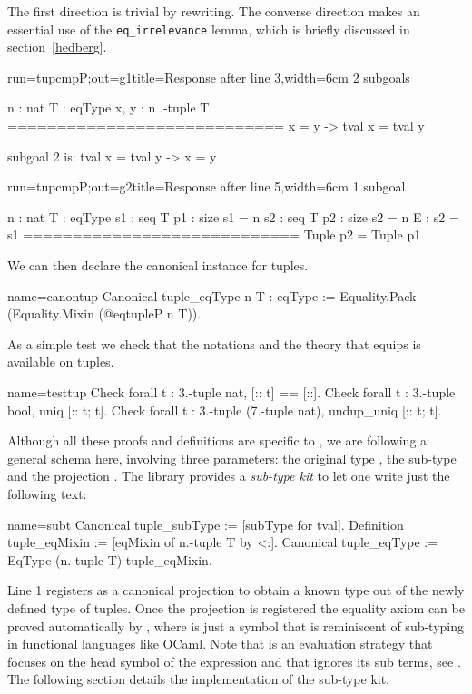 The first direction is trivial by rewriting.
The converse direction makes an essential use of
the \lstinline/eq_irrelevance/ lemma, which is briefly discussed
in section~\ref{hedberg}.

\begin{coqout}{run=tupcmpP;out=g1}{title=Response after line 3,width=6cm}
2 subgoals

n : nat
T : eqType
x, y : n .-tuple T
============================
x = y -> tval x = tval y

subgoal 2 is:
  tval x = tval y -> x = y
$~$
\end{coqout}
\begin{coqout}{run=tupcmpP;out=g2}{title=Response after line 5,width=6cm}
1 subgoal

n : nat
T : eqType
s1 : seq T
p1 : size s1 = n
s2 : seq T
p2 : size s2 = n
E : s2 = s1
============================
Tuple p2 = Tuple p1
\end{coqout}

We can then declare the canonical  instance for tuples.

\begin{coq}{name=canontup}{}
Canonical tuple_eqType n T : eqType :=
  Equality.Pack (Equality.Mixin (@eqtupleP n T)).
\end{coq}

As a simple test we check that the notations and the theory
that equips  is available on tuples.

\begin{coq}{name=testtup}{}
Check forall t : 3.-tuple nat, [:: t] == [::].
Check forall t : 3.-tuple bool, uniq [:: t; t].
Check forall t : 3.-tuple (7.-tuple nat), undup_uniq [:: t; t].
\end{coq}

Although all these proofs and definitions are specific to ,
we are following a general schema here, involving
three parameters: the original type , the sub-type
 and the projection .
The \mcbMC{} library provides a \emph{sub-type kit} to let one
write just the following text:

\begin{coq}{name=subt}{}
Canonical tuple_subType := [subType for tval].
Definition tuple_eqMixin := [eqMixin of n.-tuple T by <:].
Canonical tuple_eqType := EqType (n.-tuple T) tuple_eqMixin.
\end{coq}

Line 1 registers  as a canonical projection to obtain a known
type out of the newly defined type of tuples.  Once the projection
is registered the equality axiom can be proved automatically by
, where \C{<:} is just a symbol
that is reminiscent of sub-typing in functional languages like OCaml.
Note that  is an evaluation strategy that focuses on the head
symbol of the expression and that ignores its sub terms, see \cite[section
5.3.7, ``Performing computations'']{Coq:manual}.
The following section details the implementation of the sub-type kit.


